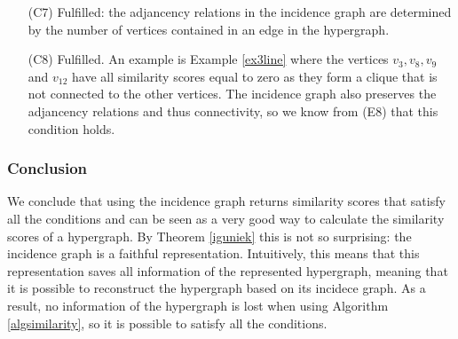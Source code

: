 \documentclass[a4paper,11pt]{report}
\newtheorem{theorem}{Theorem}[section]
\newcommand{\hgraf}{\mathcal{G}}
\begin{document}
\begin{itemize}
We know prove that the incidence graph preserves the interchangeability of edges and 
vertices:
\begin{theorem}
   The incidence graph of a hypergraph preserves structural equivalent vertices. \end{theorem}
 \begin{proof}
   The structural equivalent vertices of a hypergraph $\hgraf$ form an equivalence class on the set of vertices
   $V$, take an equivalence $\overline{v_i}$ with $|\overline{v_i}| > 1$ (we assume that $\hgraf$ has at least two structural equivalent vertices),
   this means that all vertices in $\overline{v_i}$ have exactly the same adjacency structure in the hypegraph $\hgraf$.  
   So, when a vertex in $\overline{v_i}$ is adjacent to a vertex $v_p$, all 
   vertices in $\overline{v_i}$ are adjacent with the same edge $E_k$ to $v_p$ in the hypergraph 
   $\hgraf$. By the definition of the incidence graph, this means that all vertices in 
   in $\overline{v_i}$ will be connected to the edge $E_k$ connecting them to $v_p$ in the 
   incidence graph.  So in the incidence graph, all vertices in $\overline{v_i}$ will be adjacent to 
  the same vertices and the same edges, making them also structural equivalent by the definition of structural equivalent vertices in graphs. With the same reasoning, we conlcude
  that also the structural equivalent edges are preserved.  
   
 \end{proof}



  \item[(C7)] Fulfilled: the adjancency relations in the incidence graph are determined by the number of vertices
  contained in an edge in the hypergraph.
    \item[(C8)] Fulfilled. An example is Example \ref{ex3line} where the 
    vertices $v_3, v_8, v_9$ and $v_12$ have all similarity scores equal to zero 
    as they form a clique that is not connected to the other vertices. The 
    incidence graph also preserves the adjancency relations and thus 
    connectivity, so we know from (E8) that this condition holds.
  \end{itemize}  
  \subsubsection{Conclusion}
  We conclude that using the incidence graph returns similarity scores that 
  satisfy all the conditions and can be seen as a very good way to calculate the 
  similarity scores of a hypergraph. By Theorem \ref{iguniek} this is not so 
  surprising: the incidence graph is a faithful representation. Intuitively, 
  this means that this representation saves all information of the represented 
  hypergraph, meaning that it is possible to reconstruct the hypergraph based on 
  its incidece graph. As a result, no information of the hypergraph is lost when using Algorithm \ref{algsimilarity},
  so it is possible to satisfy all the conditions. 
\end{document}
